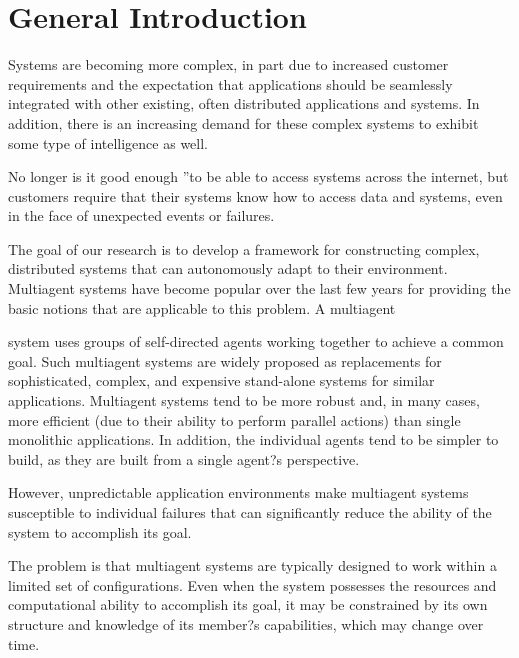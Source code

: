 
\chapter*{General Introduction}





\textbf{}


Systems are becoming more complex, in part due to increased customer requirements and the
expectation that applications should be seamlessly integrated with other existing, often distributed
applications and systems. In addition, there is an increasing demand for these complex systems to
exhibit some type of intelligence as well.

No longer is it \quotedblbase good enough \textquotedblright to be able to access systems across the internet,
but customers require that their systems know how to access data and
systems, even in the face of unexpected events or failures.

The goal of our research is to develop a framework for constructing complex, distributed systems
that can autonomously adapt to their environment. Multiagent systems have become popular over
the last few years for providing the basic notions that are applicable to this problem. A multiagent

system uses groups of self-directed agents working together to achieve a common goal. Such
multiagent systems are widely proposed as replacements for sophisticated, complex, and
expensive stand-alone systems for similar applications. Multiagent systems tend to be more
robust and, in many cases, more efficient (due to their ability to perform parallel actions) than
single monolithic applications. In addition, the individual agents tend to be simpler to build, as
they are built from a single agent?s perspective.

However, unpredictable application environments make multiagent systems susceptible to
individual failures that can significantly reduce the ability of the system to accomplish its goal.

The problem is that multiagent systems are typically designed to work within a limited set of
configurations. Even when the system possesses the resources and computational ability to
accomplish its goal, it may be constrained by its own structure and knowledge of its member?s
capabilities, which may change over time. 

